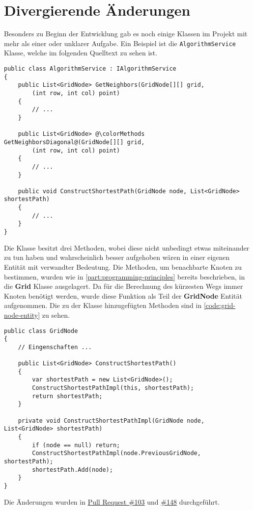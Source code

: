 \section{Divergierende Änderungen}
Besonders zu Beginn der Entwicklung gab es noch einige Klassen
im Projekt mit mehr als einer oder unklarer Aufgabe.
Ein Beispiel ist die \lstinline{AlgorithmService} Klasse,
welche im folgenden Quelltext zu sehen ist.
\begin{lstlisting}[caption={{\lstinline{AlgorithmService}} Klasse},
    label={code:alg-service}]
public class AlgorithmService : IAlgorithmService
{
    public List<GridNode> GetNeighbors(GridNode[][] grid,
        (int row, int col) point)
    {
        // ...
    }

    public List<GridNode> @\colorMethods GetNeighborsDiagonal@(GridNode[][] grid,
        (int row, int col) point)
    {
        // ...
    }

    public void ConstructShortestPath(GridNode node, List<GridNode> shortestPath)
    {
        // ...
    }
}
\end{lstlisting}
Die Klasse besitzt drei Methoden, wobei diese nicht unbedingt etwas miteinander
zu tun haben und wahrscheinlich besser aufgehoben
wären in einer eigenen Entität mit verwandter Bedeutung. Die Methoden,
um benachbarte Knoten zu bestimmen, wurden wie in \autoref{part:programming-principles}
bereits beschrieben, in die \textbf{Grid} Klasse ausgelagert.
Da für die Berechnung des kürzesten Wegs immer Knoten benötigt werden, wurde diese
Funktion als Teil der \textbf{GridNode} Entität aufgenommen. Die zu der Klasse 
hinzugefügten Methoden sind in \autoref{code:grid-node-entity} zu sehen.
\begin{lstlisting}[caption={\textbf{GridNode} Entität}, label={code:grid-node-entity}]
public class GridNode
{
    // Eingenschaften ...

    public List<GridNode> ConstructShortestPath()
    {
        var shortestPath = new List<GridNode>();
        ConstructShortestPathImpl(this, shortestPath);
        return shortestPath;
    }

    private void ConstructShortestPathImpl(GridNode node, List<GridNode> shortestPath)
    {
        if (node == null) return;
        ConstructShortestPathImpl(node.PreviousGridNode, shortestPath);
        shortestPath.Add(node);
    }
}
\end{lstlisting}
Die Änderungen wurden in
\href{https://github.com/JensDll/pathfinding-visualization/pull/103}{Pull Request \#103}
und \href{https://github.com/JensDll/pathfinding-visualization/pull/148}{\#148}
durchgeführt.